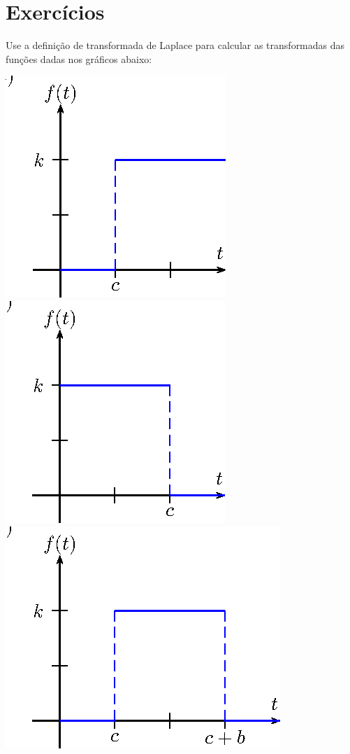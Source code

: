 \section{Exercícios}
\begin{Exercise}{\label{ex_cap_3_1}} Use a definição de transformada de Laplace para calcular as transformadas das funções dadas nos gráficos abaixo:
\begin{center}

\includegraphics{cap_definicao/pics/figura_4}
\includegraphics{cap_definicao/pics/figura_5}
\includegraphics{cap_definicao/pics/figura_6}

\end{center}
\end{Exercise}
